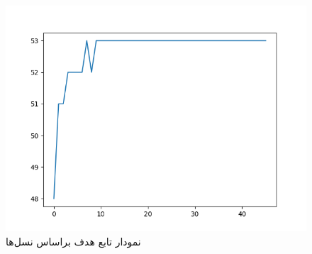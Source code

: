 \documentclass{article}
\begin{document}
   \begin{figure}[h]
   	\includegraphics{genetic-algorithm/fig}
   	\caption{
   		نمودار تابع هدف براساس نسل‌ها
   	}
   \end{figure}
\end{document}
